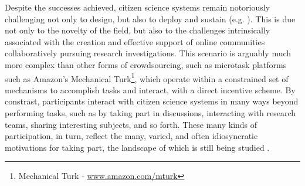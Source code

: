 \documentclass{sigchi}
\begin{document}

Despite the successes achieved, citizen science systems remain notoriously challenging not only to design, but also to deploy and sustain (e.g. \cite{ebird, ubiome, druschke2012failures}). This is due not only to the novelty of the field, but also to the challenges intrinsically associated with the creation and effective support of online communities collaboratively pursuing research investigations. This scenario is arguably much more complex than other forms of crowdsourcing, such as microtask platforms such as Amazon's Mechanical Turk\footnote{Mechanical Turk - \url{www.amazon.com/mturk}}, which operate within a constrained set of mechanisms to accomplish tasks and interact, with a direct incentive scheme. By constrast, participants  interact with citizen science systems in many ways beyond performing tasks, such as by taking part in discussions, interacting with research teams, sharing interesting subjects, and so forth.  These many kinds of participation, in turn, reflect the many, varied, and often idiosyncratic motivations for taking part, the landscape of which is still being studied \cite{raddick2010galaxy}.



\end{document}

